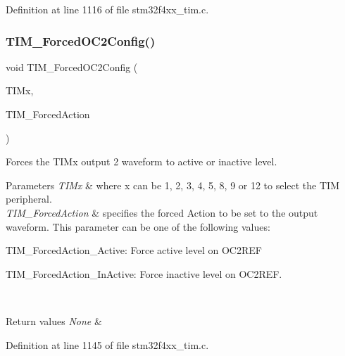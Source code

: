 Definition at line 1116 of file stm32f4xx\+\_\+tim.\+c.

\mbox{\label{group___t_i_m_ga3d2902b6fbab8dd55cd531055ffcc63d}} 
\subsubsection{\texorpdfstring{T\+I\+M\+\_\+\+Forced\+O\+C2\+Config()}{TIM\_ForcedOC2Config()}}
{\footnotesize\ttfamily void T\+I\+M\+\_\+\+Forced\+O\+C2\+Config (\begin{DoxyParamCaption}\item[{\hyperlink{struct_t_i_m___type_def}{T\+I\+M\+\_\+\+Type\+Def} $\ast$}]{T\+I\+Mx,  }\item[{uint16\+\_\+t}]{T\+I\+M\+\_\+\+Forced\+Action }\end{DoxyParamCaption})}



Forces the T\+I\+Mx output 2 waveform to active or inactive level. 


\begin{DoxyParams}{Parameters}
{\em T\+I\+Mx} & where x can be 1, 2, 3, 4, 5, 8, 9 or 12 to select the T\+IM peripheral. \\
\hline
{\em T\+I\+M\+\_\+\+Forced\+Action} & specifies the forced Action to be set to the output waveform. This parameter can be one of the following values\+: \begin{DoxyItemize}
\item T\+I\+M\+\_\+\+Forced\+Action\+\_\+\+Active\+: Force active level on O\+C2\+R\+EF \item T\+I\+M\+\_\+\+Forced\+Action\+\_\+\+In\+Active\+: Force inactive level on O\+C2\+R\+EF. \end{DoxyItemize}
\\
\hline
\end{DoxyParams}

\begin{DoxyRetVals}{Return values}
{\em None} & \\
\hline
\end{DoxyRetVals}


Definition at line 1145 of file stm32f4xx\+\_\+tim.\+c.

\mbox{\label{group___t_i_m_ga920b0fb4ca44fceffd1c3e441feebd8f}} 
